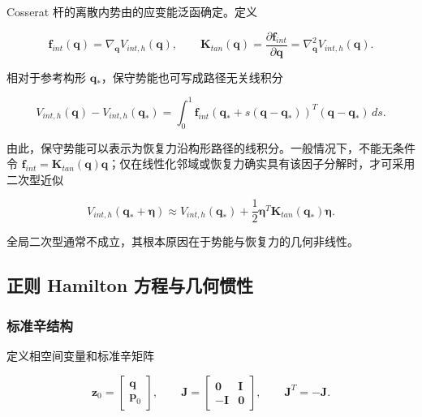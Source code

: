 Cosserat 杆的离散内势由的应变能泛函确定。定义

\begin{equation}
\label{eq:hamiltonian-3-15}
\boxed{\mathbf{f}_{int}\left( \mathbf{q} \right) = \nabla_{\mathbf{q}}V_{int,h}\left( \mathbf{q} \right),\quad\quad\mathbf{K}_{tan}\left( \mathbf{q} \right) = \frac{\partial\mathbf{f}_{int}}{\partial\mathbf{q}} = \nabla_{\mathbf{q}}^{2}V_{int,h}\left( \mathbf{q} \right).}
\end{equation}

相对于参考构形 \(\mathbf{q}_{*}\)，保守势能也可写成路径无关线积分

\begin{equation}
\label{eq:hamiltonian-3-16}
V_{int,h}\left( \mathbf{q} \right) - V_{int,h}\left( \mathbf{q}_{*} \right) = \int_{0}^{1}\mathbf{f}_{int}\left( \mathbf{q}_{*} + s\left( \mathbf{q} - \mathbf{q}_{*} \right) \right)^{T}\left( \mathbf{q} - \mathbf{q}_{*} \right)\, ds.
\end{equation}

由此，保守势能可以表示为恢复力沿构形路径的线积分。一般情况下，不能无条件令 \(\mathbf{f}_{int} = \mathbf{K}_{tan}\left( \mathbf{q} \right)\mathbf{q}\)；仅在线性化邻域或恢复力确实具有该因子分解时，才可采用二次型近似

\begin{equation}
\label{eq:hamiltonian-3-17}
V_{int,h}\left( \mathbf{q}_{*} + \bm{\eta} \right) \approx V_{int,h}\left( \mathbf{q}_{*} \right) + \frac{1}{2}\bm{\eta}^{T}\mathbf{K}_{tan}\left( \mathbf{q}_{*} \right)\bm{\eta}.
\end{equation}

全局二次型通常不成立，其根本原因在于势能与恢复力的几何非线性。

\subsection{正则 Hamilton 方程与几何惯性}\label{sec:hamiltonian-3-3}

\subsubsection{标准辛结构}\label{sec:hamiltonian-3-3-1}

定义相空间变量和标准辛矩阵

\begin{equation}
\label{eq:hamiltonian-3-18}
\mathbf{z}_{0} = \begin{bmatrix}
\mathbf{q} \\
\mathbf{p}_{0}
\end{bmatrix},\quad\quad\mathbf{J} = \begin{bmatrix}
\mathbf{0} & \mathbf{I} \\
 - \mathbf{I} & \mathbf{0}
\end{bmatrix},\quad\quad\mathbf{J}^{T} = - \mathbf{J}.
\end{equation}

